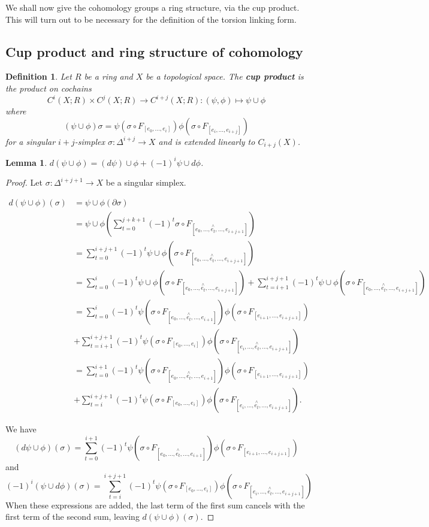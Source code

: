 \documentclass{article}
\newtheorem{definition}[theorem]{Definition}
\newtheorem{lemma}[theorem]{Lemma}
\begin{document}
\noindent We shall now give the cohomology groups a ring structure, via the cup product. This will turn out to be necessary for the definition of the torsion linking form.

\subsection{Cup product and ring structure of cohomology}
\begin{definition}
Let $R$ be a ring and $X$ be a topological space. The \textbf{cup product} is the product on cochains\[C^i(X;R)\times C^j(X;R)\to C^{i+j}(X;R):(\psi,\phi)\mapsto\psi\cup\phi\] where \[(\psi\cup\phi)\sigma=\psi(\sigma\circ F_{[e_0,...,e_i]})\phi(\sigma\circ F_{[e_i,...,e_{i+j}]})\] for a singular $i+j$-simplex $\sigma\colon\Delta^{i+j}\to X$ and is extended linearly to $C_{i+j}(X)$.
\end{definition}

\begin{lemma}
$d(\psi\cup\phi)=(d\psi)\cup\phi+(-1)^i\psi\cup d\phi$.
\end{lemma}
\begin{proof}
Let $\sigma\colon\Delta^{i+j+1}\to X$ be a singular simplex.

\begin{align*}
d(\psi\cup\phi)(\sigma)&=\psi\cup\phi(\partial\sigma)\\&=\psi\cup\phi(\sum_{t=0}^{j+k+1}(-1)^t\sigma\circ F_{[e_0,...,\overset{\wedge}{e_t},...,e_{i+j+1}]})\\&=\sum_{t=0}^{i+j+1}(-1)^t\psi\cup\phi(\sigma\circ F_{[e_0,...,\overset{\wedge}{e_t},...,e_{i+j+1}]})\\&=\sum_{t=0}^{i}(-1)^t\psi\cup\phi(\sigma\circ F_{[e_0,...,\overset{\wedge}{e_t},...,e_{i+j+1}]})+\sum_{t=i+1}^{i+j+1}(-1)^t\psi\cup\phi(\sigma\circ F_{[e_0,...,\overset{\wedge}{e_t},...,e_{i+j+1}]})\\&=\sum_{t=0}^i(-1)^t\psi(\sigma\circ F_{[e_0,...,\overset{\wedge}{e_t},...,e_{i+1}]})\phi(\sigma\circ F_{[e_{i+1},...,e_{i+j+1}]})\\&+\sum_{t=i+1}^{i+j+1}(-1)^t\psi(\sigma\circ F_{[e_0,...,e_{i}]})\phi(\sigma\circ F_{[e_{i},...,\overset{\wedge}{e_t},...,e_{i+j+1}]})\\
&=\sum_{t=0}^{i+1}(-1)^t\psi(\sigma\circ F_{[e_0,...,\overset{\wedge}{e_t},...,e_{i+1}]})\phi(\sigma\circ F_{[e_{i+1},...,e_{i+j+1}]})\\&+\sum_{t=i}^{i+j+1}(-1)^t\psi(\sigma\circ F_{[e_0,...,e_{i}]})\phi(\sigma\circ F_{[e_{i},...,\overset{\wedge}{e_t},...,e_{i+j+1}]}).
\end{align*}

\noindent We have \[(d\psi\cup\phi)(\sigma)=\sum_{t=0}^{i+1}(-1)^t\psi(\sigma\circ F_{[e_0,...,\overset{\wedge}{e_t},...,e_{i+1}]})\phi(\sigma\circ F_{[e_{i+1},...,e_{i+j+1}]})\]
and \[(-1)^i(\psi\cup d\phi)(\sigma)=\sum_{t=i}^{i+j+1}(-1)^t\psi(\sigma\circ F_{[e_0,...,e_i]})\phi(\sigma\circ F_{[e_i,...,\overset{\wedge}{e_t},...,e_{i+j+1}]})\] When these expressions are added, the last term of the first sum cancels with the first term of the second sum, leaving $d(\psi\cup\phi)(\sigma)$.
\end{proof}
\end{document}
